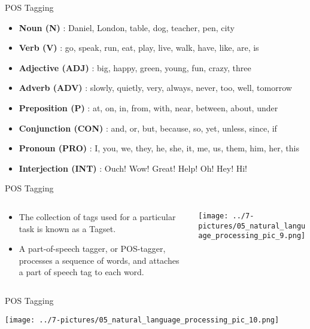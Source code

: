 \documentclass[11pt]{beamer}
\begin{document}
\begin{frame}{POS Tagging}
	\begin{itemize}
		\item \textbf{Noun (N)} : Daniel, London, table, dog, teacher, pen, city
		\item \textbf{ Verb (V)} : go, speak, run, eat, play, live, walk, have, like, are, is
		\item \textbf{ Adjective (ADJ)} : big, happy, green, young, fun, crazy, three
		\item  \textbf{ Adverb (ADV)} : slowly, quietly, very, always, never, too, well, tomorrow
		\item \textbf{ Preposition (P)} : at, on, in, from, with, near, between, about, under
		\item \textbf{ Conjunction (CON)} : and, or, but, because, so, yet, unless, since, if
		\item \textbf{ Pronoun (PRO)} : I, you, we, they, he, she, it, me, us, them, him, her, this
		\item \textbf{ Interjection (INT)} : Ouch! Wow! Great! Help! Oh! Hey! Hi!
	\end{itemize}
\end{frame}
\begin{frame}{POS Tagging}
\begin{columns}[T] %
\begin{column}{.48\textwidth}
        \begin{itemize}
		\item The collection of tags used for a particular task is known as a Tagset.
		\item A part-of-speech tagger, or POS-tagger, processes a sequence of words, and attaches a part of speech tag to each word.
        \end{itemize}
\end{column}%
\hfill%
\begin{column}{.48\textwidth}
        \texttt{[image: ../7-pictures/05\_natural\_language\_processing\_pic\_9.png]}
\end{column}%
\end{columns}
\end{frame}
\begin{frame}{POS Tagging}
	\begin{center}
	\texttt{[image: ../7-pictures/05\_natural\_language\_processing\_pic\_10.png]}
	\end{center}
\end{frame}
\end{document}
